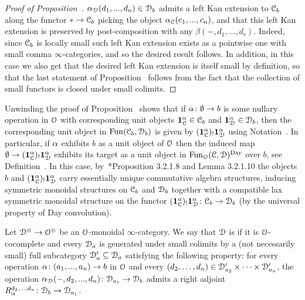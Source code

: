 \begin{proof}[Proof of Proposition~]
$\alpha_{\mathcal{D}}(d_1,...,d_n) \in \mathcal{D}_b$ admits a left Kan extension to $\mathcal C_b$ along the functor $\ast \to \mathcal C_b$ picking the object $\alpha_{\mathcal C}(c_1,...,c_n)$, and that this left Kan extension is preserved by post-composition with any $\beta(-,d_1,...,d_r)$. Indeed, since $\mathcal C_b$ is locally small such left Kan extension exists as a pointwise one with small comma $\infty$-categories, and so the desired result follows. In addition, in this case we also get that the desired left Kan extension is itself small by definition, so that the last statement of Proposition~ follows from the fact that the collection of small functors is closed under small colimits.
\end{proof}


\begin{remark}
\label{remark:units}%
Unwinding the proof of Proposition~
shows that if $\alpha\colon \emptyset\to b$ is some nullary operation in $\mathcal{O}$ with corresponding unit objects $\mathbf{1}^{\alpha}_{\mathcal C} \in \mathcal C_b$ and $\mathbf{1}^{\alpha}_{\mathcal{D}} \in \mathcal{D}_b$, then the corresponding unit object in $\operatorname{Fun}(\mathcal C_b,\mathcal{D}_b)$ is given by $(\mathbf{1}^{\alpha}_{\mathcal C})_!\mathbf{1}^{\alpha}_{\mathcal{D}}$ using Notation~. In particular, if $\alpha$ exhibits $b$ as a unit object of $\mathcal{O}$ then the induced map $\emptyset \to (\mathbf{1}^{\alpha}_{\mathcal C})_!\mathbf{1}^{\alpha}_{\mathcal{D}}$ exhibits its target as a unit object in $\operatorname{Fun}_{\mathcal{O}}(\mathcal C,\mathcal{D})^{\mathrm{Day}}$ over $b$,
see Definition~. In this case, by~\cite{HA}*{Proposition 3.2.1.8 and Lemma 3.2.1.10} the objects $b$ and $(\mathbf{1}^{\alpha}_{\mathcal C})_!\mathbf{1}^{\alpha}_{\mathcal{D}}$ carry essentially unique commutative algebra structures, inducing symmetric monoidal structures on $\mathcal C_b$ and $\mathcal{D}_{b}$ together with a compatible lax symmetric monoidal structure on the functor $(\mathbf{1}^{\alpha}_{\mathcal C})_!\mathbf{1}^{\alpha}_{\mathcal{D}} \colon \mathcal C_b \to \mathcal{D}_b$ (by the universal property of Day convolution).
\end{remark}









\begin{definition}
\label{definition:almost-presentable}%
\label{definition:presentable}%
Let $\mathcal{D}^{\otimes} \to \mathcal{O}^{\otimes}$ be an $\mathcal{O}$-monoidal $\infty$-category. We say that $\mathcal{D}$ is  if it is $\mathcal{O}$-cocomplete and every $\mathcal{D}_a$ is generated under small colimits by a 
(not necessarily small) full subcategory $\mathcal{D}'_a \subseteq \mathcal{D}_a$ 
satisfying the following property: for every operation $\alpha\colon (a_1,...,a_n) \to b$ in $\mathcal{O}$ and every $(d_2,\dots,d_n) \in \mathcal{D}'_{a_2}\times \dots \times \mathcal{D}'_{a_n}$, the operation $\alpha_{\mathcal{D}}(-,d_2,...,d_n)\colon \mathcal{D}_{a_1} \to \mathcal{D}_b$ admits a right adjoint $R^{d_2,...,d_n}_{\alpha}\colon \mathcal{D}_b \to \mathcal{D}_{a_1}$.
\end{definition}


